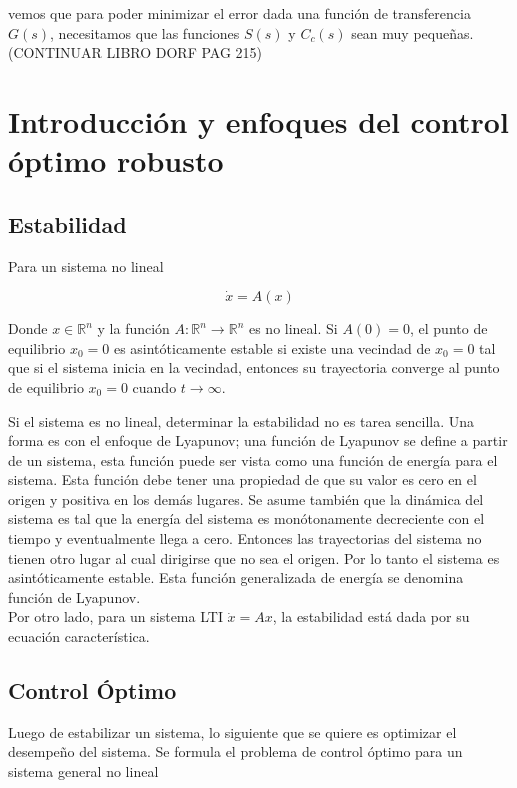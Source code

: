vemos que para poder minimizar el error dada una función de transferencia $G(s)$, necesitamos que las funciones $S(s)$ y $C_c(s)$ sean muy pequeñas. (CONTINUAR LIBRO DORF PAG 215)


\section{Introducción y enfoques del control óptimo robusto}

\subsection{Estabilidad}

Para un sistema no lineal 

\begin{equation*}
    \dot{x} = A(x)
\end{equation*}

Donde $x \in \mathbb{R}^{n}$ y la función $A:\mathbb{R}^{n} \rightarrow \mathbb{R}^{n}$ es no lineal. Si $A(0) = 0$, el punto de equilibrio $x_0=0$ es asintóticamente estable si existe una vecindad de $x_0=0$ tal que si el sistema inicia en la vecindad, entonces su trayectoria converge al punto de equilibrio $x_0=0$ cuando $t \to \infty$.

Si el sistema es no lineal, determinar la estabilidad no es tarea sencilla. Una forma es con el enfoque de Lyapunov; una función de Lyapunov se define a partir de un sistema, esta función puede ser vista como una función de energía para el sistema. Esta función debe tener una propiedad de que su valor es cero en el origen y positiva en los demás lugares. Se asume también que la dinámica del sistema es tal que la energía del sistema es monótonamente decreciente con el tiempo y eventualmente llega a cero. Entonces las trayectorias del sistema no tienen otro lugar al cual dirigirse que no sea el origen. Por lo tanto el sistema es asintóticamente estable. Esta función generalizada de energía se denomina función de Lyapunov. \\

Por otro lado, para un sistema LTI $\dot{x}=Ax$, la estabilidad está dada por su ecuación característica.

\subsection{Control Óptimo}

Luego de estabilizar un sistema, lo siguiente que se quiere es optimizar el desempeño del sistema. Se formula el problema de control óptimo para un sistema general no lineal

